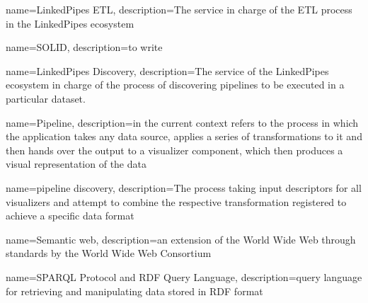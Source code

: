 
{
    name={LinkedPipes ETL},
    description={The service in charge of the ETL process in the LinkedPipes ecosystem}
}

{
    name={SOLID},
    description={to write}
}
    
{
    name={LinkedPipes Discovery},
    description={The service of the LinkedPipes ecosystem in charge of the process of discovering pipelines to be executed in a particular dataset.}
}

{
    name=Pipeline,
    description={in the current context refers to the process in which the application takes any data source, applies a series of transformations to it and then hands over the output to a visualizer component, which then produces a visual representation of the data}
}

{
    name={pipeline discovery},
    description={The process taking input descriptors for all visualizers and attempt to combine the respective transformation registered to achieve a specific data format}
}

{
    name={Semantic web},
    description={an extension of the World Wide Web through standards by the World Wide Web Consortium}
}

{
    name={SPARQL Protocol and RDF Query Language},
    description={query language for retrieving and manipulating data stored in RDF format}
}
